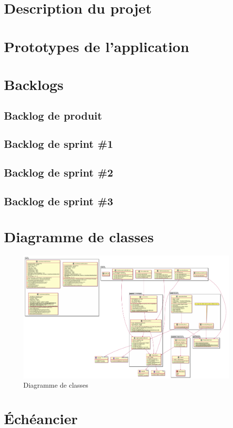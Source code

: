 \documentclass{article}
\begin{document}

\tableofcontents

\newpage

\section{Description du projet}
    

\section{Prototypes de l'application}
    

\newpage

\section{Backlogs}
    \subsection{Backlog de produit}
        

\newpage

    \subsection{Backlog de sprint \#1}
        
    \subsection{Backlog de sprint \#2}
        
    \subsection{Backlog de sprint \#3}
        

\section{Diagramme de classes}
    \begin{figure}[ht!]
        \centering
        \caption{Diagramme de classes}
        \includegraphics[width=0.8\linewidth]{images/diagramme_classes.pdf}
    \end{figure}

\section{Échéancier}
    
\end{document}
